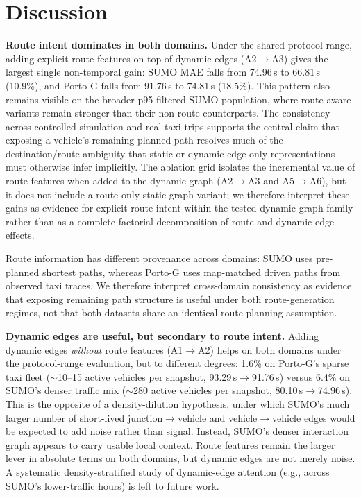 \section{Discussion}\label{sec6}

\textbf{Route intent dominates in both domains.} Under the shared protocol range, adding explicit route features on top of dynamic edges (A2$\to$A3) gives the largest single non-temporal gain: SUMO MAE falls from 74.96\,s to 66.81\,s (10.9\%), and Porto-G falls from 91.76\,s to 74.81\,s (18.5\%). This pattern also remains visible on the broader p95-filtered SUMO population, where route-aware variants remain stronger than their non-route counterparts. The consistency across controlled simulation and real taxi trips supports the central claim that exposing a vehicle's remaining planned path resolves much of the destination/route ambiguity that static or dynamic-edge-only representations must otherwise infer implicitly. The ablation grid isolates the incremental value of route features when added to the dynamic graph (A2$\to$A3 and A5$\to$A6), but it does not include a route-only static-graph variant; we therefore interpret these gains as evidence for explicit route intent within the tested dynamic-graph family rather than as a complete factorial decomposition of route and dynamic-edge effects.

Route information has different provenance across domains: SUMO uses pre-planned shortest paths, whereas Porto-G uses map-matched driven paths from observed taxi traces. We therefore interpret cross-domain consistency as evidence that exposing remaining path structure is useful under both route-generation regimes, not that both datasets share an identical route-planning assumption.

\textbf{Dynamic edges are useful, but secondary to route intent.} Adding dynamic edges \emph{without} route features (A1$\to$A2) helps on both domains under the protocol-range evaluation, but to different degrees: 1.6\% on Porto-G's sparse taxi fleet ($\sim$10--15 active vehicles per snapshot, 93.29\,s$\to$91.76\,s) versus 6.4\% on SUMO's denser traffic mix ($\sim$280 active vehicles per snapshot, 80.10\,s$\to$74.96\,s). This is the opposite of a density-dilution hypothesis, under which SUMO's much larger number of short-lived junction$\to$vehicle and vehicle$\to$vehicle edges would be expected to add noise rather than signal. Instead, SUMO's denser interaction graph appears to carry usable local context. Route features remain the larger lever in absolute terms on both domains, but dynamic edges are not merely noise. A systematic density-stratified study of dynamic-edge attention (e.g., across SUMO's lower-traffic hours) is left to future work.

